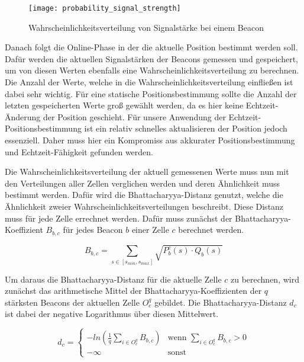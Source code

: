 \begin{figure}[htb!]
		\centering
	\texttt{[image: probability\_signal\_strength]}
	\caption{Wahrscheinlichkeitsverteilung von Signalstärke bei einem Beacon}
	\label{probability-signal-strength-beacon}
\end{figure}

Danach folgt die Online-Phase in der die aktuelle Position bestimmt werden soll. Dafür werden die aktuellen Signalstärken der Beacons gemessen und gespeichert, um von diesen Werten ebenfalls eine Wahrscheinlichkeitsverteilung zu berechnen. Die Anzahl der Werte, welche in die Wahrscheinlichkeitsverteilung einfließen ist dabei sehr wichtig.
Für eine statische Positionsbestimmung sollte die Anzahl der letzten gespeicherten Werte groß gewählt werden, da es hier keine Echtzeit-Änderung der Position geschieht.
Für unsere Anwendung der Echtzeit-Positionsbestimmung ist ein relativ schnelles aktualisieren der Position jedoch essenziell. Daher muss hier ein Kompromiss aus akkurater Positionsbestimmung und Echtzeit-Fähigkeit gefunden werden.

Die Wahrscheinlichkeitsverteilung der aktuell gemessenen Werte muss nun mit den Verteilungen aller Zellen verglichen werden und deren Ähnlichkeit muss bestimmt werden. Dafür wird die Bhattacharyya-Distanz genutzt, welche die Ähnlichkeit zweier Wahrscheinlichkeitsverteilungen beschreibt. 
Diese Distanz muss für jede Zelle errechnet werden. 
Dafür muss zunächst der Bhattacharyya-Koeffizient $B_{b, c}$ für jedes Beacon $b$ einer Zelle $c$ berechnet werden.

\begin{equation}
	B_{b, c} = \sum_{s \in [s_{min},s_{max}]} \sqrt{P_{b}^{c}(s) \cdot Q_{b}(s)}
\end{equation}

Um daraus die Bhattacharyya-Distanz für die aktuelle Zelle $c$ zu berechnen, wird zunächst das arithmetische Mittel der Bhattacharyya-Koeffizienten der $q$ stärksten Beacons der aktuellen Zelle $O_{c}^{q}$ gebildet. Die Bhattacharyya-Distanz $d_{c}$ ist dabei der negative Logarithmus über diesen Mittelwert.

\begin{equation}
	d_{c}= \begin{cases}
	-ln (\frac{1}{q} \sum_{i \in O_{c}^{q}} B_{b, c}) & \text{wenn } \sum_{i \in O_{c}^{q}} B_{b, c} > 0 \\
	- \infty & \text{sonst}
	\end{cases}
\end{equation}

